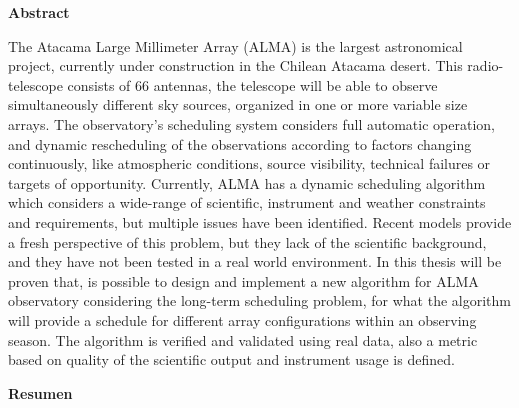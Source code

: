 \thispagestyle{empty}
\vspace*{\fill}

\begin{center}
\begin{LARGE}\textbf{Abstract}\end{LARGE}
\end{center}

The Atacama Large Millimeter Array (ALMA) is the largest astronomical project, currently under
construction in the Chilean Atacama desert. This radio-telescope consists of 66
antennas, the telescope will be able to observe simultaneously different sky sources, organized in one or more
variable size arrays. The observatory's scheduling system considers full automatic
operation, and dynamic rescheduling of the observations according to factors changing continuously, like atmospheric
conditions, source visibility, technical failures or targets of opportunity.
Currently, ALMA has a dynamic scheduling algorithm which considers a wide-range of scientific,
instrument and weather constraints and requirements, but multiple issues have been
identified. Recent models provide a fresh perspective of this problem, but they lack of the
scientific background, and they have not been tested in a real world environment.
In this thesis will be proven that, is possible to design and implement a new algorithm for ALMA observatory 
considering the long-term scheduling problem, for what the algorithm will provide a schedule 
for different array configurations within an observing
season. The algorithm is verified and validated using real data, also a metric based on quality
of the scientific output and instrument usage is defined.

\vspace{0.5cm}

\begin{center}
\begin{LARGE}\textbf{Resumen}\end{LARGE}
\end{center}

